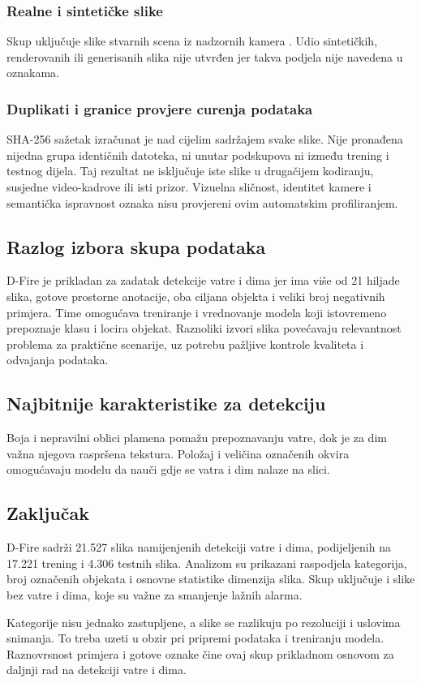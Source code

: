 \subsubsection{Realne i sintetičke slike}
Skup uključuje slike stvarnih scena iz nadzornih kamera \cite{dfire}. Udio sintetičkih, renderovanih ili generisanih slika nije utvrđen jer takva podjela nije navedena u oznakama.

\subsubsection{Duplikati i granice provjere curenja podataka}
SHA-256 sažetak izračunat je nad cijelim sadržajem svake slike. Nije pronađena nijedna grupa identičnih datoteka, ni unutar podskupova ni između trening i testnog dijela. Taj rezultat ne isključuje iste slike u drugačijem kodiranju, susjedne video-kadrove ili isti prizor. Vizuelna sličnost, identitet kamere i semantička ispravnost oznaka nisu provjereni ovim automatskim profiliranjem.

\subsection{Razlog izbora skupa podataka}
D-Fire je prikladan za zadatak detekcije vatre i dima jer ima više od 21 hiljade slika, gotove prostorne anotacije, oba ciljana objekta i veliki broj negativnih primjera. Time omogućava treniranje i vrednovanje modela koji istovremeno prepoznaje klasu i locira objekat. Raznoliki izvori slika povećavaju relevantnost problema za praktične scenarije, uz potrebu pažljive kontrole kvaliteta i odvajanja podataka.

\subsection{Najbitnije karakteristike za detekciju}
Boja i nepravilni oblici plamena pomažu prepoznavanju vatre, dok je za dim važna njegova raspršena tekstura. Položaj i veličina označenih okvira omogućavaju modelu da nauči gdje se vatra i dim nalaze na slici.

\subsection{Zaključak}
D-Fire sadrži 21.527 slika namijenjenih detekciji vatre i dima, podijeljenih na 17.221 trening i 4.306 testnih slika. Analizom su prikazani raspodjela kategorija, broj označenih objekata i osnovne statistike dimenzija slika. Skup uključuje i slike bez vatre i dima, koje su važne za smanjenje lažnih alarma.

Kategorije nisu jednako zastupljene, a slike se razlikuju po rezoluciji i uslovima snimanja. To treba uzeti u obzir pri pripremi podataka i treniranju modela. Raznovrsnost primjera i gotove oznake čine ovaj skup prikladnom osnovom za daljnji rad na detekciji vatre i dima.
